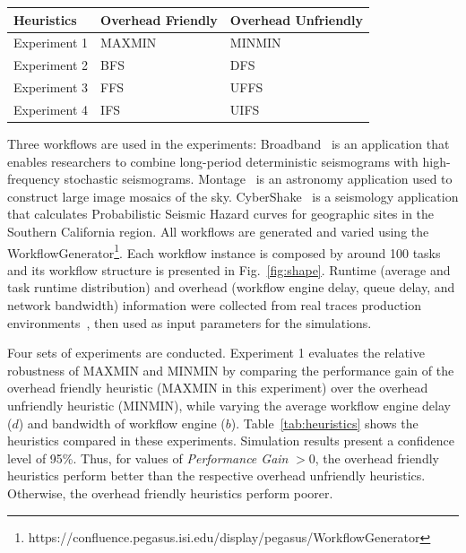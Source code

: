 \documentclass[final]{IEEEtran}
\begin{document}
\begin{center}
  \begin{tabular}{ l|l|l}
    \hline
Heuristics & Overhead Friendly & Overhead Unfriendly \\ \hline
    Experiment 1 & MAXMIN & MINMIN \\ \hline
   Experiment 2 & BFS & DFS \\ \hline
 Experiment 3 & FFS & UFFS \\ \hline
Experiment 4 & IFS & UIFS\\
    \hline
  \end{tabular}
\label{tab:heuristics}
\end{center}

Three workflows are used in the experiments: 
Broadband~\cite{Broadband} is an application that enables researchers to combine long-period deterministic seismograms with high-frequency stochastic seismograms. 
Montage~\cite{Sakellariou2010} is an astronomy application used to construct large image mosaics of the sky. CyberShake~\cite{Callaghan2008} is a seismology application that calculates Probabilistic Seismic Hazard curves for geographic sites in the Southern California region. All workflows are generated and varied using the WorkflowGenerator\footnote[1]{https://confluence.pegasus.isi.edu/display/pegasus/WorkflowGenerator}. Each workflow instance is composed by around 100 tasks and its workflow structure is presented in Fig.~\ref{fig:shape}. Runtime (average and task runtime distribution) and overhead (workflow engine delay, queue delay, and network bandwidth) information were collected from real traces production environments~\cite{Chen, Juve2013}, then used as input parameters for the simulations.




Four sets of experiments are conducted. Experiment 1 evaluates the relative robustness of MAXMIN and MINMIN by comparing the performance gain of the overhead friendly heuristic (MAXMIN in this experiment) over the overhead unfriendly heuristic (MINMIN), while varying the average workflow engine delay ($d$) and bandwidth of workflow engine ($b$). Table~\ref{tab:heuristics} shows the heuristics compared in these experiments. Simulation results present a confidence level of 95\%. Thus, for values of \emph{Performance Gain} $> 0$, the overhead friendly heuristics perform better than the respective overhead unfriendly heuristics. Otherwise, the overhead friendly heuristics perform poorer.
\end{document}
